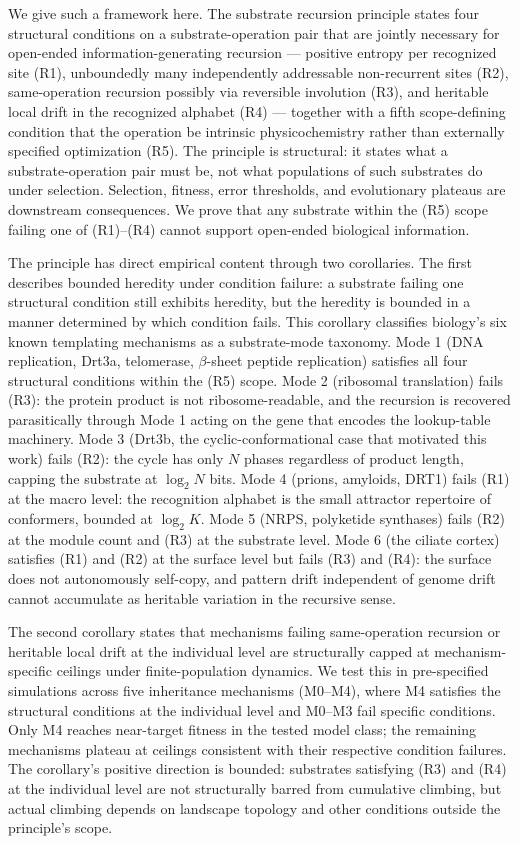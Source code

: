 \documentclass[aps,prx,reprint,amsmath,amssymb,floatfix,superscriptaddress,nofootinbib]{revtex4-2}
\theoremstyle{plain-thm}
\theoremstyle{definition-thm}
\begin{document}
We give such a framework here. The substrate recursion principle states four structural conditions on a substrate-operation pair that are jointly necessary for open-ended information-generating recursion --- positive entropy per recognized site (R1), unboundedly many independently addressable non-recurrent sites (R2), same-operation recursion possibly via reversible involution (R3), and heritable local drift in the recognized alphabet (R4) --- together with a fifth scope-defining condition that the operation be intrinsic physicochemistry rather than externally specified optimization (R5). The principle is structural: it states what a substrate-operation pair must be, not what populations of such substrates do under selection. Selection, fitness, error thresholds, and evolutionary plateaus are downstream consequences. We prove that any substrate within the (R5) scope failing one of (R1)--(R4) cannot support open-ended biological information.

The principle has direct empirical content through two corollaries. The first describes bounded heredity under condition failure: a substrate failing one structural condition still exhibits heredity, but the heredity is bounded in a manner determined by which condition fails. This corollary classifies biology's six known templating mechanisms as a substrate-mode taxonomy. Mode 1 (DNA replication, Drt3a, telomerase, $\beta$-sheet peptide replication) satisfies all four structural conditions within the (R5) scope. Mode 2 (ribosomal translation) fails (R3): the protein product is not ribosome-readable, and the recursion is recovered parasitically through Mode 1 acting on the gene that encodes the lookup-table machinery. Mode 3 (Drt3b, the cyclic-conformational case that motivated this work) fails (R2): the cycle has only $N$ phases regardless of product length, capping the substrate at $\log_2 N$ bits. Mode 4 (prions, amyloids, DRT1) fails (R1) at the macro level: the recognition alphabet is the small attractor repertoire of conformers, bounded at $\log_2 K$. Mode 5 (NRPS, polyketide synthases) fails (R2) at the module count and (R3) at the substrate level. Mode 6 (the ciliate cortex) satisfies (R1) and (R2) at the surface level but fails (R3) and (R4): the surface does not autonomously self-copy, and pattern drift independent of genome drift cannot accumulate as heritable variation in the recursive sense.

The second corollary states that mechanisms failing same-operation recursion or heritable local drift at the individual level are structurally capped at mechanism-specific ceilings under finite-population dynamics. We test this in pre-specified simulations across five inheritance mechanisms (M0--M4), where M4 satisfies the structural conditions at the individual level and M0--M3 fail specific conditions. Only M4 reaches near-target fitness in the tested model class; the remaining mechanisms plateau at ceilings consistent with their respective condition failures. The corollary's positive direction is bounded: substrates satisfying (R3) and (R4) at the individual level are not structurally barred from cumulative climbing, but actual climbing depends on landscape topology and other conditions outside the principle's scope.
\end{document}
